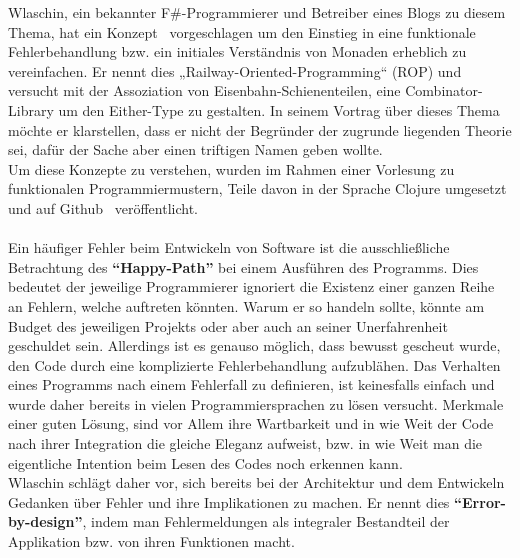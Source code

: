 \documentclass[10pt,journal,compsoc]{IEEEtran}
\begin{document}
   Wlaschin, ein bekannter F\#-Programmierer und Betreiber eines Blogs zu diesem Thema, hat ein Konzept~\cite{railwayWlaschin} vorgeschlagen um den Einstieg in eine funktionale Fehlerbehandlung bzw. ein initiales Verständnis von Monaden erheblich zu vereinfachen.
  Er nennt dies „Railway-Oriented-Programming“ (ROP) und versucht mit der Assoziation von Eisenbahn-Schienenteilen, eine Combinator-Library um den Either-Type zu gestalten.
  In seinem Vortrag über dieses Thema~\cite{railwayWlaschinNdc} möchte er klarstellen, dass er nicht der Begründer der zugrunde liegenden Theorie sei, dafür der Sache aber einen triftigen Namen geben wollte.\\
  Um diese Konzepte zu verstehen, wurden im Rahmen einer Vorlesung zu funktionalen Programmiermustern, Teile davon in der Sprache Clojure umgesetzt und auf Github~\cite{ropclojure} veröffentlicht.\\\\
  Ein häufiger Fehler beim Entwickeln von Software ist die ausschließliche Betrachtung des \textbf{"`Happy-Path"'} bei einem Ausführen des Programms.
  Dies bedeutet der jeweilige Programmierer ignoriert die Existenz einer ganzen Reihe an Fehlern, welche auftreten könnten.
  Warum er so handeln sollte, könnte am Budget des jeweiligen Projekts oder aber auch an seiner Unerfahrenheit geschuldet sein.
  Allerdings ist es genauso möglich, dass bewusst gescheut wurde, den Code durch eine komplizierte Fehlerbehandlung aufzublähen.
  Das Verhalten eines Programms nach einem Fehlerfall zu definieren, ist keinesfalls einfach und wurde daher bereits in vielen Programmiersprachen zu lösen versucht.
  Merkmale einer guten Lösung, sind vor Allem ihre Wartbarkeit und in wie Weit der Code nach ihrer Integration die gleiche Eleganz aufweist, bzw. in wie Weit man die eigentliche Intention beim Lesen des Codes noch erkennen kann.\\
  Wlaschin schlägt daher vor, sich bereits bei der Architektur und dem Entwickeln Gedanken über Fehler und ihre Implikationen zu machen. Er nennt dies \textbf{"`Error-by-design"'}, indem man Fehlermeldungen als integraler Bestandteil der Applikation bzw. von ihren Funktionen macht.
\end{document}
